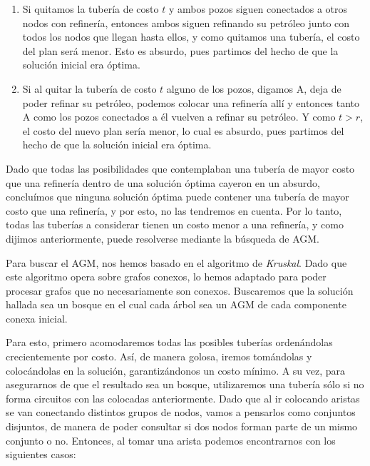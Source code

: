 \begin{enumerate}
	\begin{enumerate}
		\item Si quitamos la tubería de costo $t$ y ambos pozos siguen conectados a otros nodos con refinería, entonces ambos siguen refinando su petróleo junto con todos los nodos que llegan hasta ellos, y como quitamos una tubería, el costo del plan será menor.  Esto es absurdo, pues partimos del hecho de que la solución inicial era óptima.
		\item Si al quitar la tubería de costo $t$ alguno de los pozos, digamos A, deja de poder refinar su petróleo, podemos colocar una refinería allí y entonces tanto A como los pozos conectados a él vuelven a refinar su petróleo. Y como $t > r$, el costo del nuevo plan sería menor, lo cual es absurdo, pues partimos del hecho de que la solución inicial era óptima.
	\end{enumerate}
	
\end{enumerate}

Dado que todas las posibilidades que contemplaban una tubería de mayor costo que una refinería dentro de una solución óptima cayeron en un absurdo, concluímos que ninguna solución óptima puede contener una tubería de mayor costo que una refinería, y por esto, no las tendremos en cuenta. Por lo tanto, todas las tuberías a considerar tienen un costo menor a una refinería, y como dijimos anteriormente, puede resolverse mediante la búsqueda de AGM.

Para buscar el AGM, nos hemos basado en el algoritmo de {\it Kruskal}.  Dado que este algoritmo opera sobre grafos conexos, lo hemos adaptado para poder procesar grafos que no necesariamente son conexos. Buscaremos que la solución hallada sea un bosque en el cual cada árbol sea un AGM de cada componente conexa inicial.

Para esto, primero acomodaremos todas las posibles tuberías ordenándolas crecientemente por costo. Así, de manera golosa, iremos tomándolas y colocándolas en la solución, garantizándonos un costo mínimo. A su vez, para asegurarnos de que el resultado sea un bosque, utilizaremos una tubería sólo si no forma circuitos con las colocadas anteriormente. Dado que al ir colocando aristas se van conectando distintos grupos de nodos, vamos a pensarlos como conjuntos disjuntos, de manera de poder consultar si dos nodos forman parte de un mismo conjunto o no.  Entonces, al tomar una arista podemos encontrarnos con los siguientes casos:

